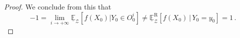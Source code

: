 \documentclass[twoside,11pt]{article}
\newcommand{\nats}{\mathbb{N}}
\newcommand{\reals}{\mathbb{R}}
\newcommand{\realspos}{\reals_{>0}}
\newcommand{\states}{\mathcal{X}}
\newcommand{\observs}{\mathcal{Y}}
\newcommand{\lexp}{\underline{\mathbb{E}}_{\rateset,\mathcal{M}}}
\newcommand{\gambles}{\mathcal{L}}
\newcommand{\rateset}{\mathcal{Q}}
\begin{document}
\begin{proof}
We conclude from this that
\begin{equation*}
-1 =  \lim_{i\to+\infty} \underline{\mathbb{E}}_\mathcal{Z}[f(X_0)\vert Y_0\in O_0^i] \neq \underline{\mathbb{E}}_\mathcal{Z}^\mathrm{R}[f(X_0)\,\vert\, Y_0=y_0] = 1\,.
\end{equation*}
\end{proof}

%
%
\end{document}
